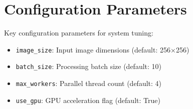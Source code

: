 \documentclass[12pt,a4paper]{article}
\begin{document}
\section{Configuration Parameters}

Key configuration parameters for system tuning:

\begin{itemize}
    \item \texttt{image\_size}: Input image dimensions (default: 256×256)
    \item \texttt{batch\_size}: Processing batch size (default: 10)
    \item \texttt{max\_workers}: Parallel thread count (default: 4)
    \item \texttt{use\_gpu}: GPU acceleration flag (default: True)
\end{itemize}
\end{document}
